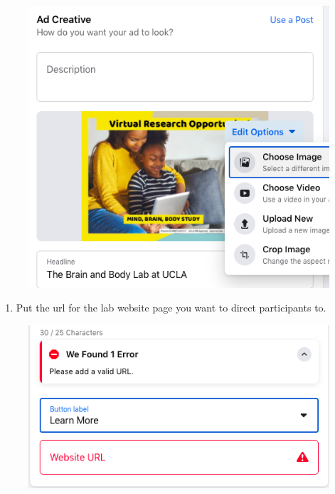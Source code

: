 \documentclass[]{book}
\providecommand{\tightlist}{%
  \setlength{\itemsep}{0pt}\setlength{\parskip}{0pt}}
\begin{document}
\begin{figure}
\centering
\includegraphics{images/lab_protocols/fb_ads/5.png}
\caption{}
\end{figure}

\begin{enumerate}
\def\labelenumi{\arabic{enumi}.}
\setcounter{enumi}{5}
\tightlist
\item
  Put the url for the lab website page you want to direct participants to.
\end{enumerate}

\begin{figure}
\centering
\includegraphics{images/lab_protocols/fb_ads/6.png}
\caption{}
\end{figure}
\end{document}
